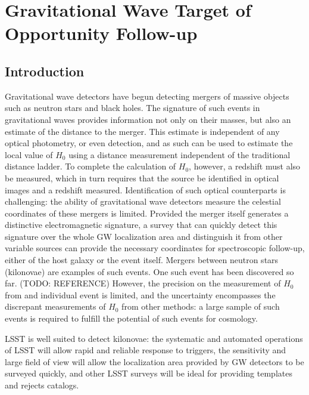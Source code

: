 \section{Gravitational Wave Target of Opportunity Follow-up}

\subsection{Introduction}

Gravitational wave detectors have begun detecting mergers of massive objects such as neutron stars and black holes. The signature of such events in gravitational waves provides information not only on their masses, but also an estimate of the distance to the merger. This estimate is independent of any optical photometry, or even detection, and as such can be used to estimate the local value of $H_0$ using a distance measurement independent of the traditional distance ladder. To complete the calculation of $H_0$, however, a redshift must also be measured, which in turn requires that the source be identified in optical images and a redshift measured. Identification of such optical counterparts is challenging: the ability of gravitational wave detectors measure the celestial coordinates of these mergers is limited. Provided the merger itself generates a distinctive electromagnetic signature, a survey that can quickly detect this signature over the whole GW localization area and distinguish it from other variable sources can provide the necessary coordinates for spectroscopic follow-up, either of the host galaxy or the event itself. Mergers between neutron stars (kilonovae) are examples of such events. One such event has been discovered so far. (TODO: REFERENCE) However, the precision on the measurement of $H_0$ from and individual event is limited, and the uncertainty encompasses the discrepant measurements of $H_0$ from other methods: a large sample of such events is required to fulfill the potential of such events for cosmology.

LSST is well suited to detect kilonovae: the systematic and automated operations of LSST will allow rapid and reliable response to triggers, the sensitivity and large field of view will allow the localization area provided by GW detectors to be surveyed quickly, and other LSST surveys will be ideal for providing templates and rejects catalogs.

